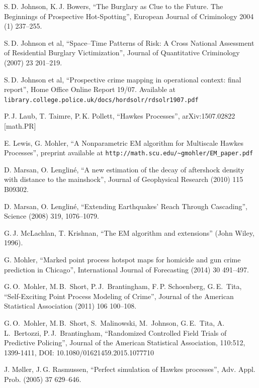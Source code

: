 \documentclass[twoside,a4paper]{article}
\theoremstyle{plain}
\theoremstyle{definition}
\begin{document}
\begin{thebibliography}{99}
 S.\,D. Johnson, K.\,J. Bowers,
	``The Burglary as Clue to the Future. The Beginnings of Prospective Hot-Spotting'',
	European Journal of Criminology 2004 (1) 237--255.
	
 S.\,D. Johnson et al,
	``Space--Time Patterns of Risk: A Cross National Assessment of
	Residential Burglary Victimization'',
	Journal of Quantitative Criminology (2007) 23 201--219.
	
 S.\,D. Johnson et al,
	``Prospective crime mapping in operational context: final report'',
	Home Office Online Report 19/07.  Available at
	\texttt{library.college.police.uk/docs/hordsolr/rdsolr1907.pdf}

 P.\,J. Laub, T. Taimre, P.\,K. Pollett,
	``Hawkes Processes'', arXiv:1507.02822 [math.PR]

 E. Lewis, G. Mohler,
	``A Nonparametric EM algorithm for Multiscale Hawkes Processes'',
	preprint available at \texttt{http://math.scu.edu/\textasciitilde gmohler/EM\_paper.pdf}

 D. Marsan, O. Lenglin\'e,
	``A new estimation of the decay of aftershock density with distance to the mainshock'',
	Journal of Geophysical Research (2010) 115 B09302.

 D. Marsan, O. Lenglin\'e,
	``Extending Earthquakes' Reach Through Cascading'',
	Science (2008) 319, 1076--1079.

 G.\,J. McLachlan, T. Krishnan, ``The EM algorithm and extensions''
	(John Wiley, 1996).
	
 G. Mohler, ``Marked point process hotspot maps for homicide and
gun crime prediction in Chicago'',
	International Journal of Forecasting (2014) 30 491--497.

 G.\,O.~Mohler, M.\,B.~Short, P.\,J.~Brantingham, F.\,P. Schoenberg, G.\,E.~Tita,
	``Self-Exciting Point Process Modeling of Crime'',
	Journal of the American Statistical Association (2011) 106 100--108.

 G.\,O.~Mohler, M.\,B.~Short, S.~Malinowski, M.~Johnson, G.\,E.~Tita, 
   A.\,L.~Bertozzi, P.\,J.~Brantingham,
   ``Randomized Controlled Field Trials of Predictive Policing'',
   Journal of the American Statistical Association, 110:512, 1399-1411, DOI:
	10.1080/01621459.2015.1077710

 J. M\o ller, J.\,G. Rasmussen,
	``Perfect simulation of Hawkes processes'',
	Adv. Appl. Prob. (2005) 37 629--646.


\end{thebibliography}
\end{document}
